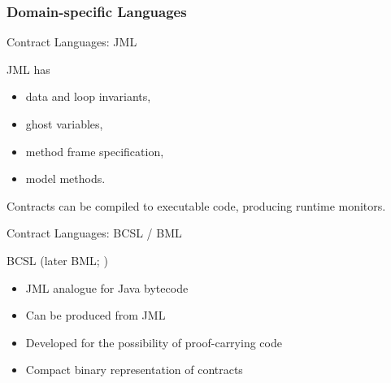 \documentclass[12pt]{beamer}
\begin{document}
\subsubsection{Domain-specific Languages}
\label{sec:runver-dbc-dsl}

\begin{frame}[fragile]{Contract Languages: \small JML \parencite{jml}}

  JML\footnotemark{} has

  \begin{itemize}
    \item data and loop invariants,
    \item ghost variables,
    \item method frame specification,
    \item model methods.
  \end{itemize}

  Contracts can be compiled to executable code, producing runtime
  monitors.

\end{frame}


\begin{frame}{Contract Languages: \small BCSL / BML \parencite{bcsl}}

  BCSL\footnotemark{} (later BML\footnotemark; \cite{bml})

  \begin{itemize}
    \item JML analogue for Java bytecode
    \item Can be produced from JML
    \item Developed for the possibility of proof-carrying code
    \item Compact binary representation of contracts
  \end{itemize}

\end{frame}
\end{document}
